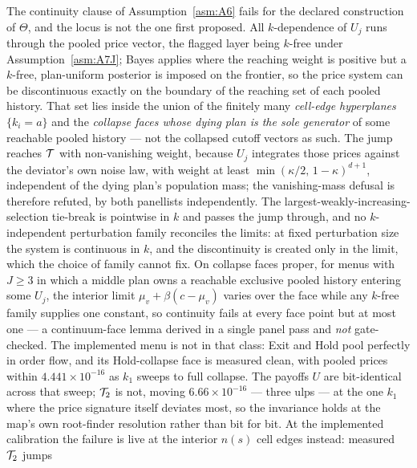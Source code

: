 \begin{remark}
\label{rem:A6record}
\setlength{\emergencystretch}{3em}%
The continuity clause of Assumption~\ref{asm:A6} fails for the declared construction of $\Theta$,
and the locus is not the one first proposed. All $k$-dependence of $U_j$ runs through the pooled
price vector, the flagged layer being $k$-free under Assumption~\ref{asm:A7J}; Bayes applies where
the reaching weight is positive but a $k$-free, plan-uniform posterior is imposed on the frontier,
so the price system can be discontinuous exactly on the boundary of the reaching set of each pooled
history. That set lies inside the union of the finitely many \emph{cell-edge hyperplanes}
$\{k_i = a\}$ and the \emph{collapse faces whose dying plan is the sole generator} of some reachable
pooled history --- not the collapsed cutoff vectors as such. The jump reaches $\mathcal{T}$ with
non-vanishing weight, because $U_j$ integrates those prices against the deviator's own noise law,
with weight at least $\min(\kappa/2,\,1-\kappa)^{d+1}$, independent of the dying plan's population
mass; the vanishing-mass defusal is therefore refuted, by both panellists independently. The
largest-weakly-increasing-selection tie-break is pointwise in $k$ and passes the jump through, and no
$k$-independent perturbation family reconciles the limits: at fixed perturbation size the system is
continuous in $k$, and the discontinuity is created only in the limit, which the choice of family
cannot fix. On collapse faces proper, for menus with $J \ge 3$ in which a middle plan owns a
reachable exclusive pooled history entering some $U_j$, the interior limit
$\mu_v + \beta(c - \mu_v)$ varies over the face while any $k$-free family supplies one constant, so
continuity fails at every face point but at most one --- a continuum-face lemma derived in a single
panel pass and \emph{not} gate-checked. The implemented menu is not in that class: Exit and Hold pool
perfectly in order flow, and its Hold-collapse face is measured clean, with pooled prices within
$4.441\times10^{-16}$ as $k_1$ sweeps to full collapse. The payoffs $U$ are bit-identical across
that sweep; $\mathcal{T}_2$ is not, moving $6.66\times10^{-16}$ --- three ulps --- at the one $k_1$ where
the price signature itself deviates most, so the invariance holds at the map's own root-finder
resolution rather than bit for bit. At the implemented
calibration the failure is live at the interior $n(s)$ cell edges instead: measured $\mathcal{T}_2$ jumps

\end{remark}
